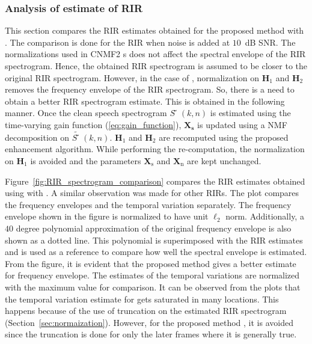 \subsubsection{Analysis of estimate of RIR}
\label{sec:RIR_estimate_comparison}
This section compares the RIR estimates obtained for the proposed method 
with . The comparison is done for the RIR  when noise is added at $10$~dB SNR. The normalizations used in CNMF2 s does not affect the spectral envelope of the RIR spectrogram. Hence, the obtained RIR spectrogram is assumed to be closer to the original RIR spectrogram. However, in the case of , normalization on $\mathbf{H}_1$ and $\mathbf{H}_2$ removes the frequency envelope of the RIR spectrogram. So, there is a need to obtain a better RIR spectrogram estimate. This is obtained in the following manner. Once the clean speech spectrogram $S̃(k,n)$ is estimated using the time-varying gain function (\ref{eq:gain_function}), $\mathbf{X_{\text{s}}}$ is updated using a NMF decomposition on $\tilde{S̃}(k,n)$. $\mathbf{H}_1$ and $\mathbf{H}_2$ are recomputed using the proposed enhancement algorithm. While performing the re-computation, the normalization on $\mathbf{H}_1$ is avoided and the parameters $\mathbf{X}_{\text{s}}$ and $\mathbf{X}_{\text{n}}$ are kept unchanged.

Figure~\ref{fig:RIR_spectrogram_comparison} compares the RIR estimates obtained using  with . 
A similar observation was made for other RIRs. The plot compares the frequency envelopes and the temporal variation separately. The frequency envelope shown in the figure is normalized to have unit $\ell_2$ norm. Additionally, a $40$ degree polynomial approximation of the original frequency envelope is also shown as a dotted line. This polynomial is superimposed with the RIR estimates and is used as a reference to compare how well the spectral envelope is estimated. From the figure, it is evident that the proposed method  gives a better estimate for frequency envelope. The estimates of the temporal variations are normalized with the maximum value for comparison. It can be observed from the plots that the temporal variation estimate for  gets saturated in many locations. This happens because of the use of truncation on the estimated RIR spectrogram (Section~\ref{sec:normaization}).   However, for the proposed method , it is avoided since the truncation is done for only the later frames where it is generally true.

